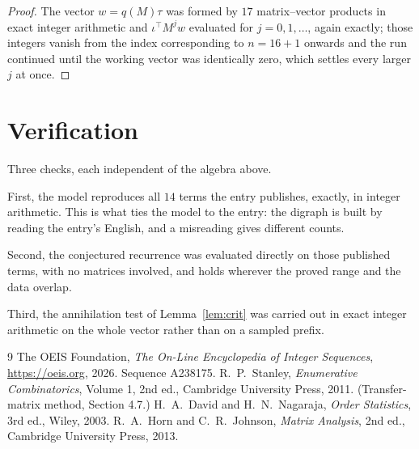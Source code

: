 \documentclass[11pt,a4paper]{article}
\theoremstyle{plain}
\theoremstyle{definition}
\begin{document}
\begin{proof}
The vector $w=q(M)\tau$ was formed by $17$ matrix--vector products in exact integer
arithmetic and $\iota^{\!\top}M^{j}w$ evaluated for $j=0,1,\dots$, again exactly; those
integers vanish from the index corresponding to $n=16+1$ onwards and the run continued
until the working vector was identically zero, which settles every larger $j$ at once.
\end{proof}

\section{Verification}

Three checks, each independent of the algebra above.

First, the model reproduces all $14$ terms the entry publishes, exactly, in integer
arithmetic. This is what ties the model to the entry: the digraph is built by reading the
entry's English, and a misreading gives different counts.

Second, the conjectured recurrence was evaluated directly on those published terms, with no
matrices involved, and holds wherever the proved range and the data overlap.

Third, the annihilation test of Lemma~\ref{lem:crit} was carried out in exact integer
arithmetic on the whole vector rather than on a sampled prefix.

\begin{thebibliography}{9}
 The OEIS Foundation, \emph{The On-Line Encyclopedia of Integer
Sequences}, \url{https://oeis.org}, 2026. Sequence A238175.
 R.~P.~Stanley, \emph{Enumerative Combinatorics}, Volume 1, 2nd ed.,
Cambridge University Press, 2011. (Transfer-matrix method, Section 4.7.)
 H.~A.~David and H.~N.~Nagaraja, \emph{Order Statistics}, 3rd ed., Wiley,
2003.
 R.~A.~Horn and C.~R.~Johnson, \emph{Matrix Analysis}, 2nd ed., Cambridge
University Press, 2013.
\end{thebibliography}
\end{document}
